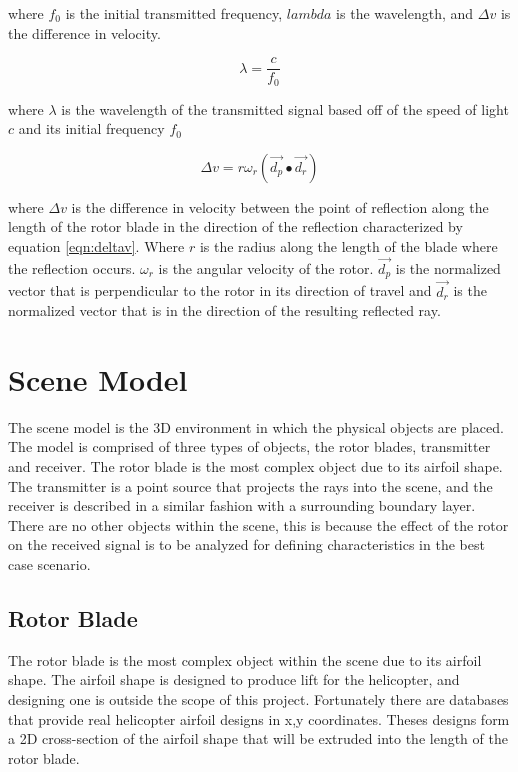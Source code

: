 where $f_0$ is the initial transmitted frequency, $lambda$ is the wavelength, and $\Delta v$ is the difference in velocity.

\begin{equation}
	\lambda = \frac{c}{f_0}
	\label{eqn:wavelength}
\end{equation}

where $\lambda$ is the wavelength of the transmitted signal based off of the speed of light $c$ and its initial frequency $f_0$

\begin{equation}
	\Delta v = r \omega_r (\vec{d_p} \bullet \vec{d_r})
	\label{eqn:deltav}
\end{equation}

where $\Delta v$ is the difference in velocity between the point of reflection along the length of the rotor blade in the direction of the reflection characterized by equation \ref{eqn:deltav}. Where $r$ is the radius along the length of the blade where the reflection occurs. $\omega_r$ is the angular velocity of the rotor. $\vec{d_p}$ is the normalized vector that is perpendicular to the rotor in its direction of travel and $\vec{d_r}$ is the normalized vector that is in the direction of the resulting reflected ray.


\section{Scene Model}
The scene model is the 3D environment in which the physical objects are placed. 
The model is comprised of three types of objects, the rotor blades, transmitter and receiver. The rotor blade is the most complex object due to its airfoil shape. The transmitter is a point source that projects the rays into the scene, and the receiver is described in a similar fashion with a surrounding boundary layer. There are no other objects within the scene, this is because the effect of the rotor on the received signal is to be analyzed for defining characteristics in the best case scenario.

\subsection{Rotor Blade}
The rotor blade is the most complex object within the scene due to its airfoil shape. The airfoil shape is designed to produce lift for the helicopter, and designing one is outside the scope of this project. Fortunately there are databases that provide real helicopter airfoil designs in x,y coordinates. Theses designs form a 2D cross-section of the airfoil shape that will be extruded into the length of the rotor blade. 

